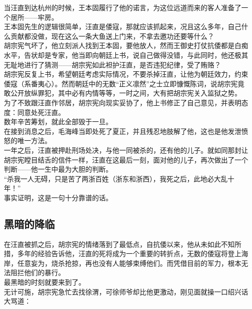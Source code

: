 \begin{multicols}{\theparacolNo}
当汪直到达杭州的时候，王本固履行了他的诺言，为这位远道而来的客人准备了一个居所——牢房。\\

王本固先生的逻辑很简单，汪直是倭寇，那就应该抓起来，况且这么多年，自己什么贡献都没做，现在这么一条大鱼送上门来，不拿去邀功还要等什么？\\

胡宗宪气坏了，他立刻派人找到王本固，要他放人，然而王御史打仗抗倭都是白痴水平，告状却是专家，他当即向朝廷上书，说自己做得没错，与此同时，他还极其无耻地进行了猜测——胡宗宪如此袒护汪直，是否违犯纪律，受了贿赂？\\

胡宗宪反复上书，希望朝廷考虑实际情况，不要杀掉汪直，让他为朝廷效力，约束倭寇（系番夷心）。然而朝廷中的无数“正义凛然”之士立即慷慨陈词，说胡宗宪竟敢公开放纵罪犯，其中必有内情等等，一时之间，大有把胡宗宪关入监狱之势。\\

为了不致跟汪直作邻居，胡宗宪向现实妥协了，他上书修正了自己意见，并表明态度：同意处死汪直。\\

数年辛苦筹划，就此全部毁于一旦。\\

在接到消息之后，毛海峰当即处死了夏正，并且残忍地肢解了他，这也是他发泄愤怒的唯一方法。\\

一年之后，汪直被押赴刑场处决，与他一同被杀的，还有他的儿子。就如同那封让胡宗宪瞠目结舌的信件一样，汪直在这最后一刻，面对他的儿子，再次做出了一个判断——他一生中最为大胆的判断。\\

“杀我一人无碍，只是苦了两浙百姓（浙东和浙西），我死之后，此地必大乱十年！”\\

事实证明，这是一句十分靠谱的话。\\

\subsection{黑暗的降临}
在汪直被抓之后，胡宗宪的情绪落到了最低点，自抗倭以来，他从未如此不知所措，多年的经验告诉他，汪直的死将成为一个重要的转折点，无数的倭寇将登上海岸，任意妄为，烧杀抢掠，再也没有人能够束缚他们。而凭借目前的军力，根本无法阻拦他们的暴行。\\

最黑暗的时刻就要来到了。\\

无计可施，胡宗宪急忙去找徐渭，可徐师爷却比他更激动，刚见面就操一口绍兴话大骂道：\\


\end{multicols}
